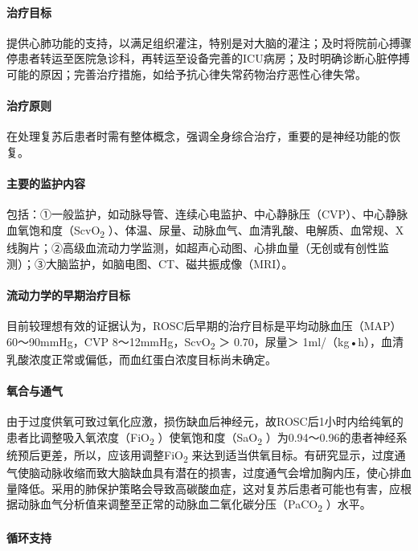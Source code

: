 \paragraph{治疗目标}

提供心肺功能的支持，以满足组织灌注，特别是对大脑的灌注；及时将院前心搏骤停患者转运至医院急诊科，再转运至设备完善的ICU病房；及时明确诊断心脏停搏可能的原因；完善治疗措施，如给予抗心律失常药物治疗恶性心律失常。

\paragraph{治疗原则}

在处理复苏后患者时需有整体概念，强调全身综合治疗，重要的是神经功能的恢复。

\paragraph{主要的监护内容}

包括：①一般监护，如动脉导管、连续心电监护、中心静脉压（CVP）、中心静脉血氧饱和度（ScvO\textsubscript{2}
）、体温、尿量、动脉血气、血清乳酸、电解质、血常规、X线胸片；②高级血流动力学监测，如超声心动图、心排血量（无创或有创性监测）；③大脑监护，如脑电图、CT、磁共振成像（MRI）。

\paragraph{流动力学的早期治疗目标}

目前较理想有效的证据认为，ROSC后早期的治疗目标是平均动脉血压（MAP）60～90mmHg，CVP
8～12mmHg，ScvO\textsubscript{2} ＞ 0.70，尿量＞
1ml/（kg•h），血清乳酸浓度正常或偏低，而血红蛋白浓度目标尚未确定。

\paragraph{氧合与通气}

由于过度供氧可致过氧化应激，损伤缺血后神经元，故ROSC后1小时内给纯氧的患者比调整吸入氧浓度（FiO\textsubscript{2}
）使氧饱和度（SaO\textsubscript{2}
）为0.94～0.96的患者神经系统预后更差，所以，应该用调整FiO\textsubscript{2}
来达到适当供氧目标。有研究显示，过度通气使脑动脉收缩而致大脑缺血具有潜在的损害，过度通气会增加胸内压，使心排血量降低。采用的肺保护策略会导致高碳酸血症，这对复苏后患者可能也有害，应根据动脉血气分析值来调整至正常的动脉血二氧化碳分压（PaCO\textsubscript{2}
）水平。

\paragraph{循环支持}

